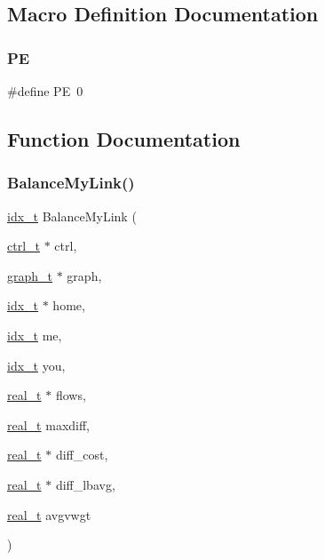 \subsection{Macro Definition Documentation}
\mbox{\label{a00341_a211238ffe3627f42ca7b04bc96cc8fa6}} 
\subsubsection{\texorpdfstring{PE}{PE}}
{\footnotesize\ttfamily \#define PE~0}



\subsection{Function Documentation}
\mbox{\label{a00341_a0c95cce46bb5d58661489c076a876018}} 
\subsubsection{\texorpdfstring{Balance\+My\+Link()}{BalanceMyLink()}}
{\footnotesize\ttfamily \hyperlink{a00876_aaa5262be3e700770163401acb0150f52}{idx\+\_\+t} Balance\+My\+Link (\begin{DoxyParamCaption}\item[{\hyperlink{a00742}{ctrl\+\_\+t} $\ast$}]{ctrl,  }\item[{\hyperlink{a00734}{graph\+\_\+t} $\ast$}]{graph,  }\item[{\hyperlink{a00876_aaa5262be3e700770163401acb0150f52}{idx\+\_\+t} $\ast$}]{home,  }\item[{\hyperlink{a00876_aaa5262be3e700770163401acb0150f52}{idx\+\_\+t}}]{me,  }\item[{\hyperlink{a00876_aaa5262be3e700770163401acb0150f52}{idx\+\_\+t}}]{you,  }\item[{\hyperlink{a00876_a1924a4f6907cc3833213aba1f07fcbe9}{real\+\_\+t} $\ast$}]{flows,  }\item[{\hyperlink{a00876_a1924a4f6907cc3833213aba1f07fcbe9}{real\+\_\+t}}]{maxdiff,  }\item[{\hyperlink{a00876_a1924a4f6907cc3833213aba1f07fcbe9}{real\+\_\+t} $\ast$}]{diff\+\_\+cost,  }\item[{\hyperlink{a00876_a1924a4f6907cc3833213aba1f07fcbe9}{real\+\_\+t} $\ast$}]{diff\+\_\+lbavg,  }\item[{\hyperlink{a00876_a1924a4f6907cc3833213aba1f07fcbe9}{real\+\_\+t}}]{avgvwgt }\end{DoxyParamCaption})}

